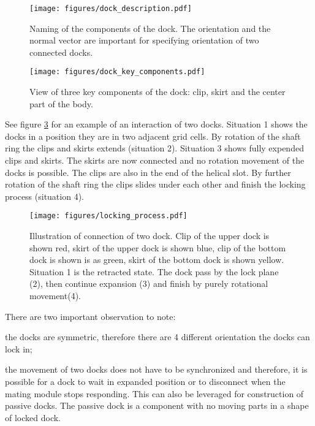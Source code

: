 \begin{figure}[t]
    \centering
    \texttt{[image: figures/dock\_description.pdf]}
    \caption{Naming of the components of the dock. The orientation and the
    normal vector are important for specifying orientation of two connected
    docks. }
    \label{fig:dock_description}
\end{figure}

\begin{figure}[t]
    \centering
    \texttt{[image: figures/dock\_key\_components.pdf]}
    \caption{View of three key components of the dock: clip, skirt and the
    center part of the body.}
    \label{fig:dock_key_components}
\end{figure}

See figure \ref{fig:dock_locking_process} for an example of an interaction of
two docks. Situation 1 shows the docks in a position they are in two adjacent
grid cells. By rotation of the shaft ring the clips and skirts extends
(situation 2). Situation 3 shows fully expended clips and skirts. The skirts are
now connected and no rotation movement of the docks is possible. The clips are
also in the end of the helical slot. By further rotation of the shaft ring the
clips slides under each other and finish the locking process (situation 4).

\begin{figure}[!ht]
    \centering
    \texttt{[image: figures/locking\_process.pdf]}
    \caption{Illustration of connection of two dock. Clip of the upper dock is
    shown red, skirt of the upper dock is shown blue, clip of the bottom dock is
    shown is as green, skirt of the bottom dock is shown yellow.  Situation 1 is
    the retracted state. The dock pass by the lock plane (2), then continue
    expansion (3) and finish by purely rotational movement(4). }
    \label{fig:dock_locking_process}
\end{figure}

There are two important observation to note:
\begin{enumerate*}
    \item the docks are symmetric, therefore there are 4 different orientation
    the docks can lock in;
    \item the movement of two docks does not have to be synchronized and
    therefore, it is possible for a dock to wait in expanded position or to
    disconnect when the mating module stops responding. This can also be
    leveraged for construction of passive docks. The passive dock is a component
    with no moving parts in a shape of locked dock.
\end{enumerate*}

